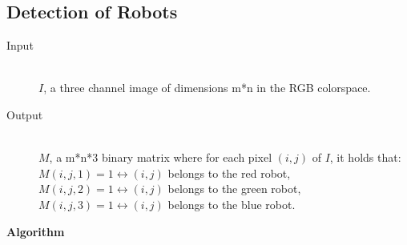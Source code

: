 \documentclass[10pt,a4paper]{article}
\begin{document}
\subsection{Detection of Robots}
\begin{description}
\item[Input] \hfill \\
    $I$, a three channel image of dimensions m*n in the RGB colorspace.
\item[Output] \hfill \\
    $M$, a m*n*3 binary matrix where for each pixel $(i,j)$ of $I$, it holds 
    that: \\
    $M(i,j,1) = 1 \leftrightarrow (i,j)$ belongs to the red robot, \\
    $M(i,j,2) = 1 \leftrightarrow (i,j)$ belongs to the green robot, \\
    $M(i,j,3) = 1 \leftrightarrow (i,j)$ belongs to the blue robot.
\end{description}
\textbf{Algorithm}
\end{document}
